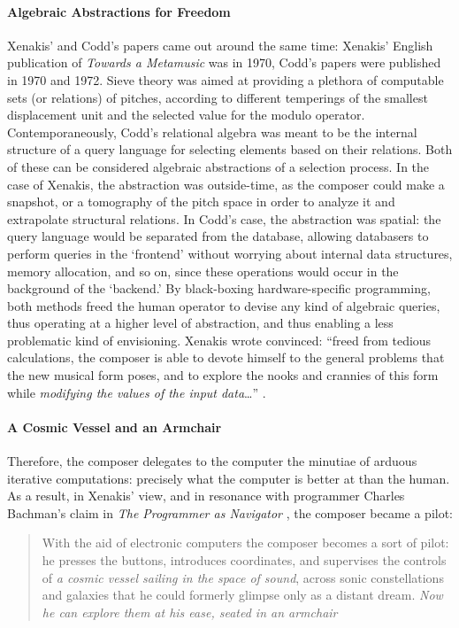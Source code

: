 \paragraph{Algebraic Abstractions for Freedom}
Xenakis' and Codd's papers came out around the same time: Xenakis' English publication of \textit{Towards a Metamusic} was in 1970, Codd's papers were published in 1970 and 1972. Sieve theory was aimed at providing a plethora of computable sets (or relations) of pitches, according to different temperings of the smallest displacement unit and the selected value for the modulo operator. Contemporaneously, Codd's relational algebra was meant to be the internal structure of a query language for selecting elements based on their relations. Both of these can be considered algebraic abstractions of a selection process. In the case of Xenakis, the abstraction was outside-time, as the composer could make a snapshot, or a tomography of the pitch space in order to analyze it and extrapolate structural relations. In Codd's case, the abstraction was spatial: the query language would be separated from the database, allowing databasers to perform queries in the `frontend' without worrying about internal data structures, memory allocation, and so on, since these operations would occur in the background of the `backend.' By black-boxing hardware-specific programming, both methods freed the human operator to devise any kind of algebraic queries, thus operating at a higher level of abstraction, and thus enabling a less problematic kind of envisioning. Xenakis wrote convinced: ``freed from tedious calculations, the composer is able to devote himself to the general problems that the new musical form poses, and to explore the nooks and crannies of this form while \textit{modifying the values of the input data}\dots'' \im \parencite[144]{Xen92:For}.

\paragraph{A Cosmic Vessel and an Armchair}
Therefore, the composer delegates to the computer the minutiae of arduous iterative computations: precisely what the computer is better at than the human. As a result, in Xenakis' view, and in resonance with programmer Charles Bachman's claim in \textit{The Programmer as Navigator} \parencite{Bachman:1973:PN:355611.362534}, the composer became a pilot:

\begin{quote}
	With the aid of electronic computers the composer becomes a sort of pilot: he presses the buttons, introduces coordinates, and supervises the controls of \textit{a cosmic vessel sailing in the space of sound}, across sonic constellations and galaxies that he could formerly glimpse only as a distant dream. \textit{Now he can explore them at his ease, seated in an armchair} \im \parencite[144]{Xen92:For}
\end{quote}

